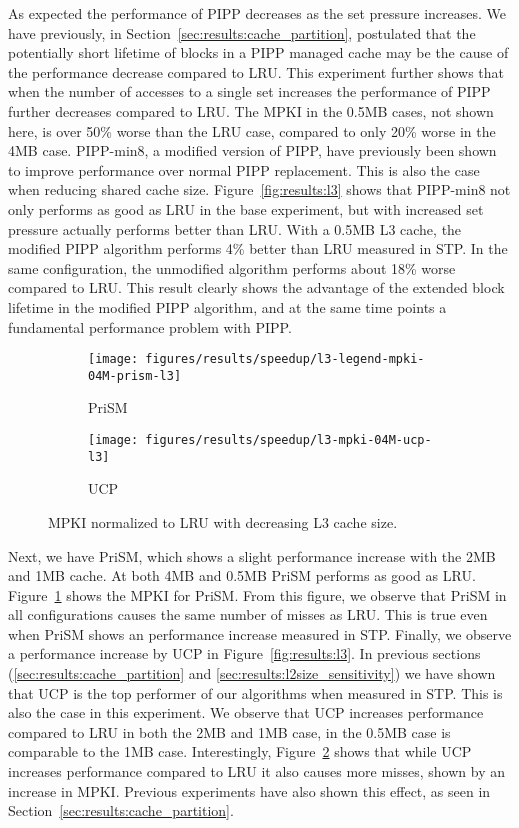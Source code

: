 As expected the performance of PIPP decreases as the set pressure increases.
We have previously, in Section~\ref{sec:results:cache_partition}, postulated that the potentially short lifetime of blocks in a PIPP managed cache may be the cause of the performance decrease compared to LRU.
This experiment further shows that when the number of accesses to a single set increases the performance of PIPP further decreases compared to LRU.
The MPKI in the 0.5MB cases, not shown here, is over 50\% worse than the LRU case, compared to only 20\% worse in the 4MB case.
PIPP-min8, a modified version of PIPP, have previously been shown to improve performance over normal PIPP replacement.
This is also the case when reducing shared cache size.
Figure~\ref{fig:results:l3} shows that PIPP-min8 not only performs as good as LRU in the base experiment, but with increased set pressure actually performs better than LRU.
With a 0.5MB L3 cache, the modified PIPP algorithm performs 4\% better than LRU measured in STP.
In the same configuration, the unmodified algorithm performs about 18\% worse compared to LRU.
This result clearly shows the advantage of the extended block lifetime in the modified PIPP algorithm, and at the same time points a fundamental performance problem with PIPP.


\begin{figure}[t]
    \centering
    \begin{subfigure}[b]{0.5\textwidth}
        \centering
        \texttt{[image: figures/results/speedup/l3-legend-mpki-04M-prism-l3]}
        \caption{PriSM}
        \label{fig:results:l3:mpki-prism}
    \end{subfigure}%
    \begin{subfigure}[b]{0.5\textwidth}
        \centering
        \texttt{[image: figures/results/speedup/l3-mpki-04M-ucp-l3]}
        \caption{UCP}
        \label{fig:results:l3:mpki-ucp}
    \end{subfigure}
    \label{fig:results:l3:mpki}
    \caption{MPKI normalized to LRU with decreasing L3 cache size.}
\end{figure}

Next, we have PriSM, which shows a slight performance increase with the 2MB and 1MB cache. 
At both 4MB and 0.5MB PriSM performs as good as LRU.
Figure~\ref{fig:results:l3:mpki-prism} shows the MPKI for PriSM.
From this figure, we observe that PriSM in all configurations causes the same number of misses as LRU.
This is true even when PriSM shows an performance increase measured in STP.
Finally, we observe a performance increase by UCP in Figure~\ref{fig:results:l3}. 
In previous sections (\ref{sec:results:cache_partition} and \ref{sec:results:l2size_sensitivity}) we have shown that UCP is the top performer of our algorithms when measured in STP.
This is also the case in this experiment.
We observe that UCP increases performance compared to LRU in both the 2MB and 1MB case, in the 0.5MB case is comparable to the 1MB case.
Interestingly, Figure~\ref{fig:results:l3:mpki-ucp} shows that while UCP increases performance compared to LRU it also causes more misses, shown by an increase in MPKI.
Previous experiments have also shown this effect, as seen in Section~\ref{sec:results:cache_partition}.
